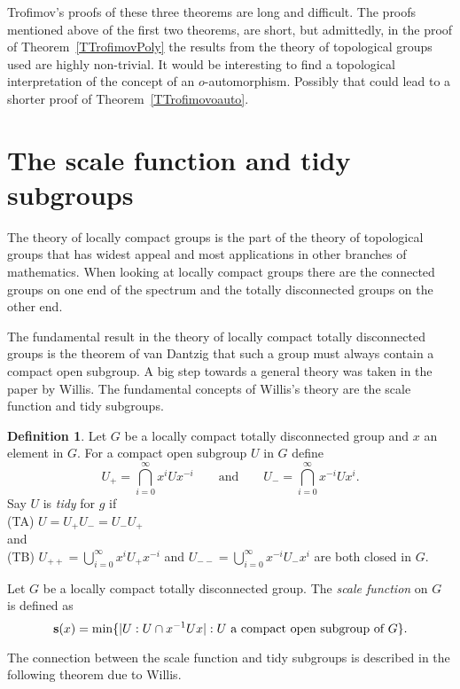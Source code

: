 \documentclass{emsprocart}
\theoremstyle{definition}
\newtheorem{definition}[theorem]{Definition}
\begin{document}
Trofimov's proofs of these three theorems are long and
difficult.  The proofs mentioned above of the first two theorems,
are
short, but admittedly, in the proof of  Theorem~\ref{TTrofimovPoly}
the results from the theory of topological groups
used are highly non-trivial.  It would be interesting to find
a topological interpretation of the concept
of an $o$-automorphism.   Possibly that could lead to a shorter proof of
Theorem~\ref{TTrofimovoauto}.

\section{The scale function and tidy subgroups}\label{STidyScale}

\indent

The theory of locally compact groups is the part of the theory of
topological groups that has widest appeal and most applications in
other branches of mathematics.  When
looking at locally compact groups there are the connected
groups on one end of the spectrum
and the totally disconnected groups on the other
end.

The fundamental result in the theory of locally compact totally
disconnected groups is the theorem of van Dantzig \cite{Dantzig1936} that
such a group must always contain a compact open subgroup.
A big step towards a general theory was taken in
the paper \cite{Willis1994} by Willis.
The fundamental concepts of Willis's theory are
the scale function and tidy subgroups.

\begin{definition}\label{DTidyscale}
Let $G$ be a locally compact totally
disconnected group and $x$ an
element in $G$. For a compact open subgroup $U$ in $G$ define
$$U_+=\bigcap_{i=0}^\infty x^iUx^{-i}\qquad\mbox{and}\qquad
      U_-=\bigcap_{i=0}^\infty x^{-i}Ux^{i}.$$
Say $U$ is {\em tidy} for $g$ if\\
{(TA)}  $U=U_+U_-=U_-U_+$\\
and \\
{(TB)} $U_{++}=\bigcup_{i=0}^\infty x^iU_+x^{-i}$ and
$U_{--}=\bigcup_{i=0}^\infty x^{-i}U_- x^{i}$ are both closed in $G$.
\par
  Let $G$ be a locally compact totally
disconnected group.
The {\em scale function} on $G$ is defined as
 $${\mbox{\bf s}}(x)=\min\{|U:U\cap x^{-1}Ux|: U \mbox{\rm\ a compact open subgroup of }
G\}.$$
\end{definition}

The connection between the scale function and tidy subgroups is
described in the following theorem due to Willis.
\end{document}
